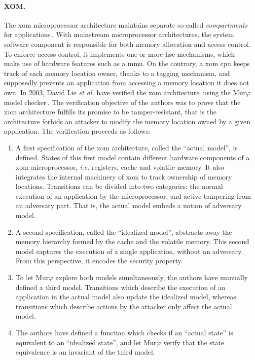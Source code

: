 \paragraph{XOM.}
%
The \ac{xom} microprocessor architecture maintains separate so-called
\emph{compartments} for applications\,\cite{lie2000architectural}.
%
With mainstream microprocessor architectures, the system software component is
responsible for both memory allocation and access control.
%
To enforce access control, it implements one or more \ac{hse} mechanisms, which
make use of hardware features such as a \ac{mmu}.
%
On the contrary, a \ac{xom} \ac{cpu} keeps track of each memory location owner,
thanks to a tagging mechanism, and supposedly prevents an application from
accessing a memory location it does not own.
%
In 2003, David Lie \emph{et al.} have verified the \ac{xom}
architecture\,\cite{lie2003xom} using the Mur$\varphi$ model
checker\,\cite{murphi}.
%
The verification objective of the authors was to prove that the \ac{xom}
architecture fulfills its promise to be tamper-resistant, that is the
architecture forbids an attacker to modify the memory location owned by a given
application.
%
The verification proceeds as follows:
%
\begin{enumerate}
\item A first specification of the \ac{xom} architecture, called the ``actual
  model'', is defined.
  States of this first model contain different hardware components of a \ac{xom}
  microprocessor, \emph{i.e.} registers, cache and volatile memory.
  It also integrates the internal machinery of \ac{xom} to track ownership of
  memory locations.
  Transitions can be divided into two categories: the normal execution of an
  application by the microprocessor, and active tampering from an adversary
  part.
  That is, the actual model embeds a notion of adversary model.
\item A second specification, called the ``idealized model'', abstracts away the
  memory hierarchy formed by the cache and the volatile memory.
  This second model captures the execution of a single application, without an
  adversary.
  From this perspective, it encodes the security property.
\item To let Mur\( \varphi \) explore both models simultaneously, the authors
  have manually defined a third model.
  Transitions which describe the execution of an application in the actual model
  also update the idealized model, whereas transitions which describe actions by
  the attacker only affect the actual model.
\item The authors have defined a function which checks if an ``actual state'' is
  equivalent to an ``idealized state'', and let Mur\( \varphi \) verify that the
  state equivalence is an invariant of the third model.
\end{enumerate}
